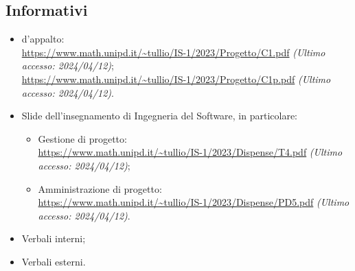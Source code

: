    \subsection{Informativi}
    \begin{itemize}
            \item {} d'appalto:\\
                    \url{https://www.math.unipd.it/~tullio/IS-1/2023/Progetto/C1.pdf} \textit{(Ultimo accesso: 2024/04/12)};\\
                    \url{https://www.math.unipd.it/~tullio/IS-1/2023/Progetto/C1p.pdf} \textit{(Ultimo accesso: 2024/04/12)}.
            \item Slide dell'insegnamento di Ingegneria del Software, in particolare:
            \begin{itemize}
                \item Gestione di progetto:\\
                \url{https://www.math.unipd.it/~tullio/IS-1/2023/Dispense/T4.pdf} \textit{(Ultimo accesso: 2024/04/12)};
                \item Amministrazione di progetto:\\
                \url{https://www.math.unipd.it/~tullio/IS-1/2023/Dispense/PD5.pdf} \textit{(Ultimo accesso: 2024/04/12)}.
            \end{itemize}
            \item Verbali interni;
            \item Verbali esterni.
    \end{itemize}

    \newpage